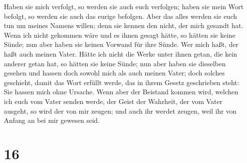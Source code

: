 Haben sie mich verfolgt, so werden sie auch euch verfolgen; haben sie
mein Wort befolgt, so werden sie auch das eurige befolgen.
 Aber das alles werden sie euch tun um meines Namens
willen; denn sie kennen den nicht, der mich gesandt hat. 
Wenn ich nicht gekommen wäre und es ihnen gesagt hätte, so hätten sie
keine Sünde; nun aber haben sie keinen Vorwand für ihre Sünde.
 Wer mich haßt, der haßt auch meinen Vater.
 Hätte ich nicht die Werke unter ihnen getan, die kein
anderer getan hat, so hätten sie keine Sünde; nun aber haben sie
dieselben gesehen und hassen doch sowohl mich als auch meinen Vater;
 doch solches geschieht, damit das Wort erfüllt werde,
das in ihrem Gesetz geschrieben steht: Sie hassen mich ohne Ursache.
 Wenn aber der Beistand kommen wird, welchen ich euch vom
Vater senden werde, der Geist der Wahrheit, der vom Vater ausgeht, so
wird der von mir zeugen;  und auch ihr werdet zeugen,
weil ihr von Anfang an bei mir gewesen seid.

\hypertarget{section-15}{%
\section{16}\label{section-15}}

